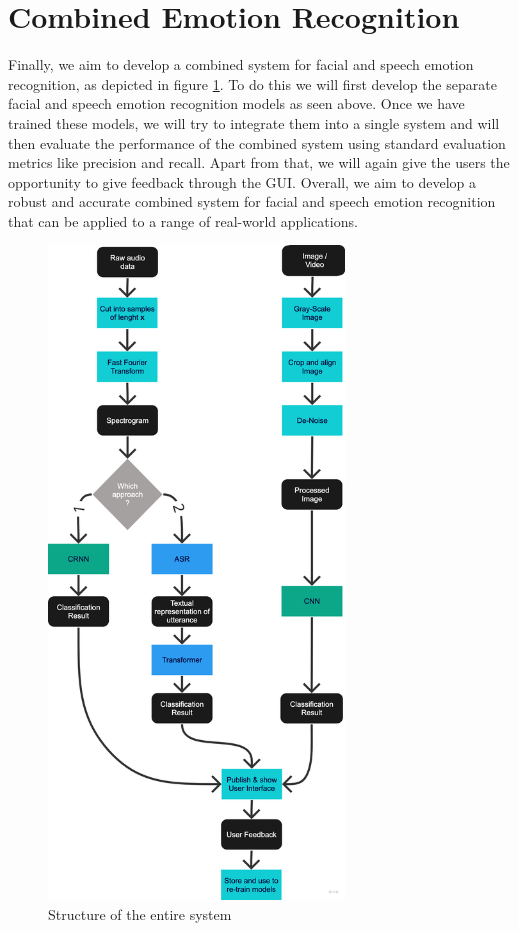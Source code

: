\section{Combined Emotion Recognition}
Finally, we aim to develop a combined system for facial and speech emotion recognition, as depicted in figure \ref{fig:whole-system}. To do this we will first develop the separate facial and speech emotion recognition models as seen above. Once we have trained these models, we will try to integrate them into a single system and will then evaluate the performance of the combined system using standard evaluation metrics like precision and recall. Apart from that, we will again give the users the opportunity to give feedback through the GUI. Overall, we aim to develop a robust and accurate combined system for facial and speech emotion recognition that can be applied to a range of real-world applications.
\begin{figure}[h]
\centering
\includegraphics[width=0.7\textwidth]{images/whole-system.png}
\caption{Structure of the entire system}\label{fig:whole-system}
\end{figure}
